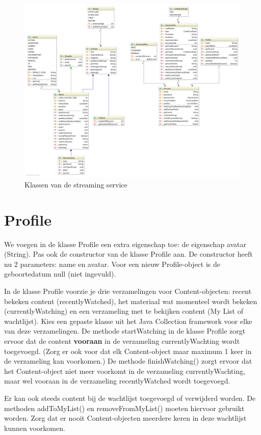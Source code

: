 \documentclass{tstextbook}
\begin{document}
\begin{figure}
  \includegraphics[width=\linewidth]{images/h1/streaming_service_v0.png}
  \caption{Klassen van de streaming service}
  \label{fig:streaming_service_class_diagram}
\end{figure}


\section{Profile}
We voegen in de klasse Profile een extra eigenschap toe: de eigenschap avatar (String). Pas ook de constructor van de klasse Profile aan. De constructor heeft nu 2 parameters: name en avatar. Voor een nieuw Profile-object is de geboortedatum null (niet ingevuld).

In de klasse Profile voorzie je drie verzamelingen voor Content-objecten: recent bekeken content (recentlyWatched), het materiaal wat momenteel wordt bekeken (currentlyWatching) en een verzameling met te bekijken content (My List of wachtlijst). Kies een gepaste klasse uit het Java Collection framework voor elke van deze verzamelingen. De methode startWatching in de klasse Profile zorgt ervoor dat de content \textbf{vooraan} in de verzameling currentlyWachting wordt toegevoegd. (Zorg er ook voor dat elk Content-object maar maximum 1 keer in de verzameling kan voorkomen.) De methode finishWatching() zorgt ervoor dat het Content-object niet meer voorkomt in de verzameling currentlyWachting, maar wel vooraan in de verzameling recentlyWatched wordt toegevoegd.

Er kan ook steeds content bij de wachtlijst toegevoegd of verwijderd worden. De methoden addToMyList() en removeFromMyList() moeten hiervoor gebruikt worden. Zorg dat er nooit Content-objecten meerdere keren in deze wachtlijst kunnen voorkomen.
\end{document}
